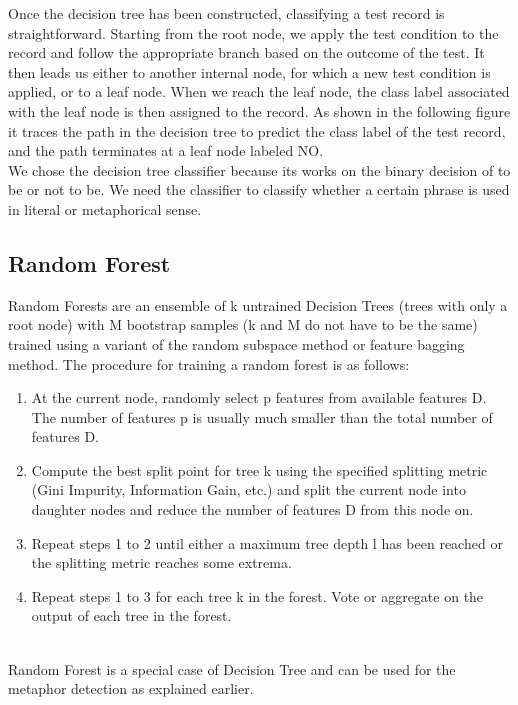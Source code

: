 \documentclass[a4paper]{article}
\begin{document}
Once the decision tree has been constructed, classifying a test record is straightforward. Starting from the root node, we apply the test condition to the record and follow the appropriate branch based on the outcome of the test. It then leads us either to another internal node, for which a new test condition is applied, or to a leaf node. When we reach the leaf node, the class label associated with the leaf node is then assigned to the record. As shown in the following figure it traces the path in the decision tree to predict the class label of the test record, and the path terminates at a leaf node labeled NO.
\\
We chose the decision tree classifier because its works on the binary decision of to be or not to be. We need the classifier to classify whether a certain phrase is used in literal or metaphorical sense.

\subsection{Random Forest}
Random Forests are an ensemble of k untrained Decision Trees (trees with only a root node) with M bootstrap samples (k and M do not have to be the same) trained using a variant of the random subspace method or feature bagging method. The procedure for training a random forest is as follows:

\begin{enumerate}
    \item At the current node, randomly select p features from available features D. The number of features p is usually much smaller than the total number of features D.
    \item Compute the best split point for tree k using the specified splitting metric (Gini Impurity, Information Gain, etc.) and split the current node into daughter nodes and reduce the number of features D from this node on.
    \item Repeat steps 1 to 2 until either a maximum tree depth l has been reached or the splitting metric reaches some extrema.
    \item Repeat steps 1 to 3 for each tree k in the forest. Vote or aggregate on the output of each tree in the forest.
\end{enumerate}
\\
Random Forest is a special case of Decision Tree and can be used for the metaphor detection as explained earlier.  
\end{document}
